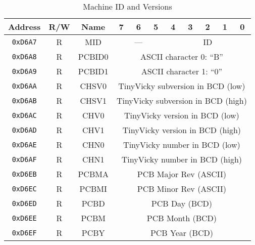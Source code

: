 \begin{table}[ht]
    \begin{center}
        \begin{tabular}{|c|c|c|c|c|c|c|c|c|c|c|} \hline
            Address & R/W & Name & 7 & 6 & 5 & 4 & 3 & 2 & 1 & 0 \\\hline\hline
            \verb+0xD6A7+ & R & MID & \multicolumn{3}{|c|}{---} & \multicolumn{5}{|c|}{ID} \\ \hline\hline

            \verb+0xD6A8+ & R & PCBID0 & \multicolumn{8}{|c|}{ASCII character 0: ``B''} \\ \hline
            \verb+0xD6A9+ & R & PCBID1 & \multicolumn{8}{|c|}{ASCII character 1: ``0''} \\ \hline
            \verb+0xD6AA+ & R & CHSV0 & \multicolumn{8}{|c|}{TinyVicky subversion in BCD (low)} \\ \hline
            \verb+0xD6AB+ & R & CHSV1 & \multicolumn{8}{|c|}{TinyVicky subversion in BCD (high)} \\ \hline
            \verb+0xD6AC+ & R & CHV0 & \multicolumn{8}{|c|}{TinyVicky version in BCD (low)} \\ \hline
            \verb+0xD6AD+ & R & CHV1 & \multicolumn{8}{|c|}{TinyVicky version in BCD (high)} \\ \hline
            \verb+0xD6AE+ & R & CHN0 & \multicolumn{8}{|c|}{TinyVicky number in BCD (low)} \\ \hline
            \verb+0xD6AF+ & R & CHN1 & \multicolumn{8}{|c|}{TinyVicky number in BCD (high)} \\ \hline\hline

            \verb+0xD6EB+ & R & PCBMA & \multicolumn{8}{|c|}{PCB Major Rev (ASCII)} \\ \hline
            \verb+0xD6EC+ & R & PCBMI & \multicolumn{8}{|c|}{PCB Minor Rev (ASCII)} \\ \hline
            \verb+0xD6ED+ & R & PCBD & \multicolumn{8}{|c|}{PCB Day (BCD)} \\ \hline
            \verb+0xD6EE+ & R & PCBM & \multicolumn{8}{|c|}{PCB Month (BCD)} \\ \hline
            \verb+0xD6EF+ & R & PCBY & \multicolumn{8}{|c|}{PCB Year (BCD)} \\ \hline
        \end{tabular}
    \end{center}
    \caption{Machine ID and Versions}
    \label{tab:machine_id_ver}
\end{table}

